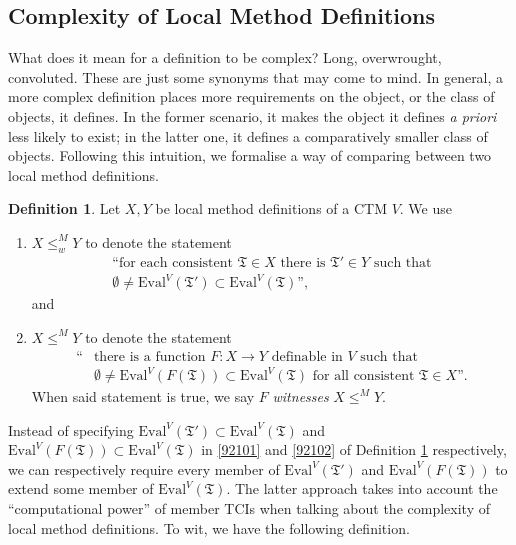 \documentclass[12pt, twoside]{memoir}
\numberwithin{equation}{section}
\theoremstyle{definition}
\newtheorem{defi}[thm]{Definition}
\theoremstyle{remark}
\theoremstyle{definition}
\theoremstyle{definition}
\theoremstyle{definition}
\theoremstyle{remark}
\begin{document}
\subsection{Complexity of Local Method Definitions}\label{ss32}

What does it mean for a definition to be complex? Long, overwrought, convoluted. These are just some synonyms that may come to mind. In general, a more complex definition places more requirements on the object, or the class of objects, it defines. In the former scenario, it makes the object it defines \textit{a priori} less likely to exist; in the latter one, it defines a comparatively smaller class of objects. Following this intuition, we formalise a way of comparing between two local method definitions.

\begin{defi}\label{def9210}
Let $X, Y$ be local method definitions of a CTM $V$. We use 
\begin{enumerate}[label=(\arabic*)]
    \item\label{92101} $X \leq^M_w Y$ to denote the statement
    \begin{gather*}
        \text{``for each consistent } \mathfrak{T} \in X \text{ there is } \mathfrak{T}' \in Y \text{ such that} \\
        \emptyset \neq \mathrm{Eval}^V(\mathfrak{T}') \subset \mathrm{Eval}^V(\mathfrak{T}) \text{'',}
    \end{gather*}
    and
    \item\label{92102} $X \leq^M Y$ to denote the statement
    \begin{align*}
        \text{``} & \text{there is a function } F : X \longrightarrow Y \text{ definable in } V \text{ such that} \\ 
        & \emptyset \neq \mathrm{Eval}^V(F(\mathfrak{T})) \subset \mathrm{Eval}^V(\mathfrak{T}) \text{ for all consistent } \mathfrak{T} \in X \text{''.}
    \end{align*}
    When said statement is true, we say $F$ \emph{witnesses} $X \leq^M Y$.
\end{enumerate}
\end{defi}

Instead of specifying $\mathrm{Eval}^V(\mathfrak{T}') \subset \mathrm{Eval}^V(\mathfrak{T})$ and $\mathrm{Eval}^V(F(\mathfrak{T})) \subset \mathrm{Eval}^V(\mathfrak{T})$ in \ref{92101} and \ref{92102} of Definition \ref{def9210} respectively, we can respectively require every member of  $\mathrm{Eval}^V(\mathfrak{T}')$ and $\mathrm{Eval}^V(F(\mathfrak{T}))$ to extend some member of $\mathrm{Eval}^V(\mathfrak{T})$. The latter approach takes into account the ``computational power'' of member TCIs when talking about the complexity of local method definitions. To wit, we have the following definition.
\end{document}
